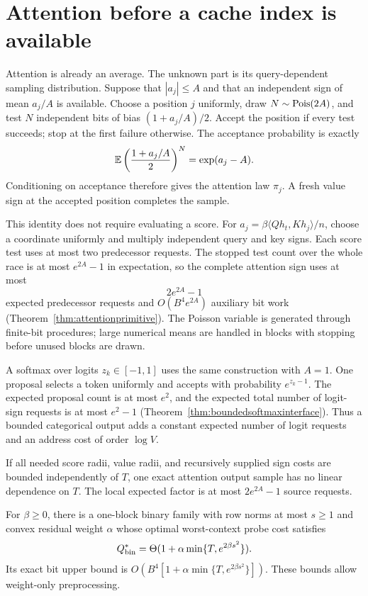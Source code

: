 \section{Attention before a cache index is available}
\label{sec:attention-main}

Attention is already an average. The unknown part is its
query-dependent sampling distribution. Suppose that $|a_j|\le A$
and that an independent sign of mean $a_j/A$ is available.
Choose a position $j$ uniformly, draw $N\sim\operatorname{Pois}(2A)$, and test
$N$ independent bits of bias $(1+a_j/A)/2$. Accept the position
if every test succeeds; stop at the first failure otherwise.
The acceptance probability is exactly
\begin{equation}
 \mathbb E\left(\frac{1+a_j/A}{2}\right)^N
 =\exp(a_j-A).
 \label{eq:main-poisson}
\end{equation}
Conditioning on acceptance therefore gives the attention law
$\pi_j$. A fresh value sign at the accepted position completes
the sample.

This identity does not require evaluating a score. For
$a_j=\beta\langle Qh_t,Kh_j\rangle/n$, choose a coordinate uniformly
and multiply independent query and key signs. Each score test uses
at most two predecessor requests. The stopped test count over the
whole race is at most $e^{2A}-1$ in expectation, so the complete
attention sign uses at most
\[
 2e^{2A}-1
\]
expected predecessor requests and $O(B^4e^{2A})$ auxiliary bit work
(Theorem~\ref{thm:attentionprimitive}).
The Poisson variable is generated through finite-bit procedures;
large numerical means are handled in blocks with stopping before
unused blocks are drawn.

A softmax over logits $z_k\in[-1,1]$ uses the same construction
with $A=1$. One proposal selects a token uniformly and accepts
with probability $e^{z_k-1}$. The expected proposal count is
at most $e^2$, and the expected total number of logit-sign
requests is at most $e^2-1$ (Theorem~\ref{thm:boundedsoftmaxinterface}).
Thus a bounded categorical output
adds a constant expected number of logit requests and an
address cost of order $\log V$.

\begin{theorem}
\label{thm:main-attention}
If all needed score radii, value radii, and recursively supplied
sign costs are bounded independently of $T$, one exact attention
output sample has no linear dependence on $T$.
The local expected factor is at most $2e^{2A}-1$ source requests.

For $\beta\ge0$, there is a one-block binary family with row norms at most $s\ge1$
and convex residual weight $\alpha$ whose optimal worst-context
probe cost satisfies
\begin{equation}
 Q^*_{\rm bin}=\Theta(1+\alpha\min\{T,e^{2\beta s^2}\}).
 \label{eq:main-binary-law}
\end{equation}
Its exact bit upper bound is
$O(B^4[1+\alpha\min\{T,e^{2\beta s^2}\}])$.
These bounds allow weight-only preprocessing.
\end{theorem}

